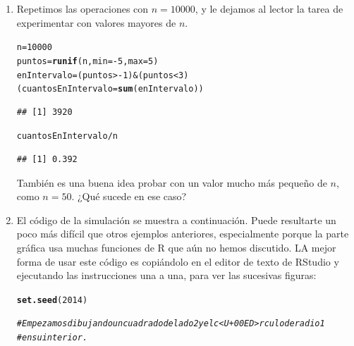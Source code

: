 \documentclass[10pt,a4paper]{article}\usepackage[]{graphicx}\usepackage[]{color}
\makeatletter
\newcommand{\hlnum}[1]{\textcolor[rgb]{0.686,0.059,0.569}{#1}}%
\newcommand{\hlcom}[1]{\textcolor[rgb]{0.678,0.584,0.686}{\textit{#1}}}%
\newcommand{\hlopt}[1]{\textcolor[rgb]{0,0,0}{#1}}%
\newcommand{\hlstd}[1]{\textcolor[rgb]{0.345,0.345,0.345}{#1}}%
\newcommand{\hlkwb}[1]{\textcolor[rgb]{0.69,0.353,0.396}{#1}}%
\newcommand{\hlkwc}[1]{\textcolor[rgb]{0.333,0.667,0.333}{#1}}%
\newcommand{\hlkwd}[1]{\textcolor[rgb]{0.737,0.353,0.396}{\textbf{#1}}}%
\newenvironment{kframe}{%
 \def\at@end@of@kframe{}%
 \ifinner\ifhmode%
  \def\at@end@of@kframe{\end{minipage}}%
  \begin{minipage}{\columnwidth}%
 \fi\fi%
 \def\FrameCommand##1{\hskip\@totalleftmargin \hskip-\fboxsep
 \colorbox{shadecolor}{##1}\hskip-\fboxsep
     \hskip-\linewidth \hskip-\@totalleftmargin \hskip\columnwidth}%
 \MakeFramed {\advance\hsize-\width
   \@totalleftmargin\z@ \linewidth\hsize
   \@setminipage}}%
 {\par\unskip\endMakeFramed%
 \at@end@of@kframe}
\newenvironment{knitrout}{}{} %
\newcounter{cont01}
\makeatother
\begin{document}
\begin{enumerate}
  \item Repetimos las operaciones con $n=10000$, y le dejamos al lector la tarea de experimentar con valores mayores de $n$.
\begin{knitrout}
\color{fgcolor}\begin{kframe}
\begin{alltt}
\hlstd{n} \hlkwb{=} \hlnum{10000}
\hlstd{puntos} \hlkwb{=} \hlkwd{runif}\hlstd{(n,} \hlkwc{min}\hlstd{=}\hlopt{-}\hlnum{5}\hlstd{,} \hlkwc{max}\hlstd{=}\hlnum{5}\hlstd{)}
\hlstd{enIntervalo} \hlkwb{=} \hlstd{(puntos} \hlopt{> -}\hlnum{1} \hlstd{)} \hlopt{&} \hlstd{(puntos} \hlopt{<} \hlnum{3}\hlstd{)}
\hlstd{(cuantosEnIntervalo} \hlkwb{=} \hlkwd{sum}\hlstd{(enIntervalo))}
\end{alltt}
\begin{verbatim}
## [1] 3920
\end{verbatim}
\begin{alltt}
\hlstd{cuantosEnIntervalo} \hlopt{/} \hlstd{n}
\end{alltt}
\begin{verbatim}
## [1] 0.392
\end{verbatim}
\end{kframe}
\end{knitrout}
  También es una buena idea probar con un valor mucho más pequeño de $n$, como $n=50$. ¿Qué sucede en ese caso?

  \item El código de la simulación se muestra a continuación. Puede resultarte un poco más difícil que otros ejemplos anteriores, especialmente porque la parte gráfica usa muchas funciones de R que aún no hemos discutido. LA mejor forma de usar este código es copiándolo en el editor de texto de RStudio y ejecutando las instrucciones una a una, para ver las sucesivas figuras:

\begin{knitrout}
\color{fgcolor}\begin{kframe}
\begin{alltt}
\hlkwd{set.seed}\hlstd{(}\hlnum{2014}\hlstd{)}

\hlcom{# Empezamos dibujando un cuadrado de lado 2 y el c<U+00ED>rculo de radio 1}
\hlcom{# en su interior.}


\end{alltt}
\end{kframe}
\end{knitrout}
\end{enumerate}
\end{document}
